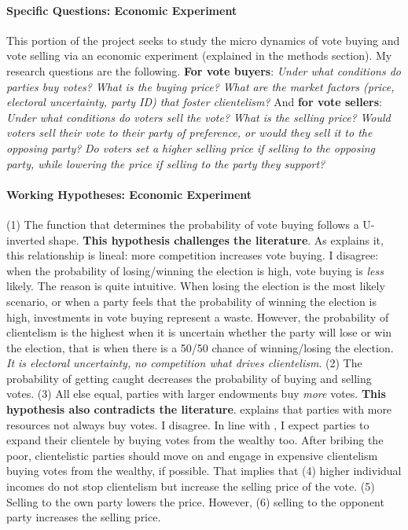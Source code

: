 \documentclass[onesided]{article}\usepackage[]{graphicx}\usepackage[]{color}
\begin{document}
\paragraph{Specific Questions: Economic Experiment} This portion of the project seeks to study the micro dynamics of vote buying and vote selling via an economic experiment (explained in the methods section). My research questions are the following. {\bf For vote buyers}: \emph{Under what conditions do parties buy votes?} \emph{What is the buying price?} \emph{What are the market factors (price, electoral uncertainty, party ID) that foster clientelism?} And {\bf for vote sellers}: \emph{Under what conditions do voters sell the vote?} \emph{What is the selling price?} \emph{Would voters sell their vote to their party of preference, or would they sell it to the opposing party?} \emph{Do voters set a higher selling price if selling to the opposing party, while lowering the price if selling to the party they support?} 


\paragraph{Working Hypotheses: Economic Experiment} (1) The function that determines the probability of vote buying follows a U-inverted shape. {\bf This hypothesis challenges the literature}. As \textcite{Weitz-shapiro} explains it, this relationship is lineal: more competition increases vote buying. I disagree: when the probability of losing/winning the election is high, vote buying is \emph{less} likely. The reason is quite intuitive. When losing the election is the most likely scenario, or when a party feels that the probability of winning the election is high, investments in vote buying represent a waste. However, the probability of clientelism is the highest when it is uncertain whether the party will lose or win the election, that is when there is a 50/50 chance of winning/losing the election. \emph{It is electoral uncertainty, no competition what drives clientelism}. (2) The probability of getting caught decreases the probability of buying and selling votes. (3) All else equal, parties with larger endowments buy \emph{more} votes. {\bf This hypothesis also contradicts the literature}. \textcite[]{Szwarcberg2013} explains that parties with more resources not always buy votes. I disagree. In line with \textcite{Bahamonde2018}, I expect parties to expand their clientele by buying votes from the wealthy too. After bribing the poor, clientelistic parties should move on and engage in expensive clientelism buying votes from the wealthy, if possible. That implies that (4) higher individual incomes do not stop clientelism but increase the selling price of the vote. (5) Selling to the own party lowers the price. However, (6) selling to the opponent party increases the selling price.
\end{document}
